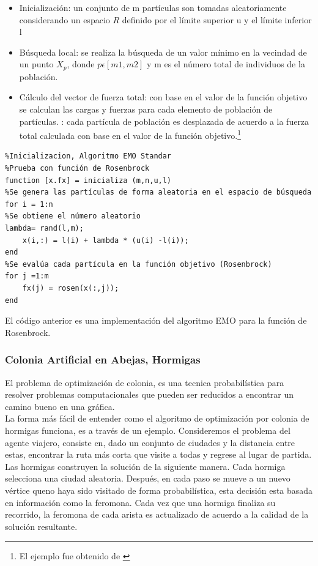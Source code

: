 \documentclass{article}
\begin{document}
\begin{itemize}
    \item Inicialización: un conjunto de m partículas son tomadas aleatoriamente considerando un espacio $R$ definido por el límite superior u y el límite inferior l
    \item Búsqueda local: se realiza la búsqueda de un valor mínimo en la vecindad de un punto $X_p$, donde $ p \epsilon [m1,m2]$ y m es el número total de individuos de la población.
    \item Cálculo del vector de fuerza total: con base en el valor de la función objetivo se calculan las cargas y fuerzas para cada elemento de población de partículas.
    \itemMovimiento: cada partícula de población es desplazada de acuerdo a la fuerza total calculada con base en el valor de la función objetivo.\footnote{El ejemplo fue obtenido de \cite{Cuevas(2016)}}
\end{itemize}
\begin{verbatim}
%Inicializacion, Algoritmo EMO Standar
%Prueba con función de Rosenbrock
function [x.fx] = inicializa (m,n,u,l)
%Se genera las partículas de forma aleatoria en el espacio de búsqueda
for i = 1:n
%Se obtiene el número aleatorio
lambda= rand(l,m);
	x(i,:) = l(i) + lambda * (u(i) -l(i));
end
%Se evalúa cada partícula en la función objetivo (Rosenbrock)
for j =1:m
	fx(j) = rosen(x(:,j));
end             
\end{verbatim}

El código anterior es una implementación del algoritmo EMO para la función de Rosenbrock.
\subsubsection{Colonia Artificial en Abejas, Hormigas}
El problema de optimización de colonia, es una tecnica probabilística para resolver problemas computacionales que pueden ser reducidos a encontrar un camino bueno en una gráfica. \\ 

La forma más fácil de entender como el algoritmo de optimización por colonia de hormigas funciona, es a través de un ejemplo. Consideremos el problema del agente viajero, consiste en, dado un conjunto de ciudades y la distancia entre estas, encontrar la ruta más corta que visite a todas y regrese al lugar de partida. \\

Las hormigas construyen la solución de la siguiente manera. Cada hormiga selecciona una ciudad aleatoria. Después, en cada paso se mueve a un nuevo vértice queno haya sido visitado de forma probabilística, esta decisión esta basada en información como la feromona. Cada vez que una hormiga finaliza su recorrido, la feromona de cada arista es actualizado de acuerdo a la calidad de la solución resultante.
\end{document}
